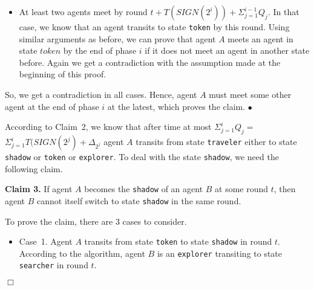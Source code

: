 \documentclass[11pt]{article}
\newcommand{\finclaim}{\hfill $\bullet$}
\newcommand{\qed}{\hfill $\Box$ \bigbreak}
\newenvironment{proof}{\noindent {\bf Proof.}}{\qed}
\begin{document}
\begin{proof}
\begin{itemize}
\item{At least two agents meet by round {$t+ T(SIGN(2^i)) + \Sigma_{j=1}^{i-1}Q_j$}. In that case, we know that an agent transits to state {\tt token} by this round. Using similar arguments as before, we can prove that agent $A$ meets an agent in state $token$ by the end of phase $i$ if it does not meet an agent in another state before. Again we get a contradiction with the assumption made at the beginning of this proof.}
\end{itemize}

{So, we get a contradiction in all cases. Hence, agent $A$ must meet some other agent at the end of phase $i$ at the latest, which proves the claim.} \finclaim

{According to Claim~2, we know that after time at most {$\Sigma_{j=1}^{i}Q_j=$\\ $\Sigma_{j=1}^{i} T(SIGN(2^j)+\Delta_{2^j}$} agent $A$ transits from state 
{\tt traveler} either to state {\tt shadow} or {\tt token} or {\tt explorer}.} {To deal with the state {\tt shadow}, we need the following claim.}

\vspace*{0.3cm}
\noindent
{{\bf Claim 3.} If agent $A$ becomes the {\tt shadow} of an agent $B$ at some round $t$, then agent $B$ cannot itself switch to state {\tt shadow} in the same round.}

{To prove the claim, there are $3$ cases to consider.}

\begin{itemize}
\item{ {Case~1.} Agent $A$ transits from state {\tt token} to state {\tt shadow} in round $t$. According to the algorithm, agent $B$ is an 
{\tt explorer} transiting to state {\tt searcher} in round $t$.}


\end{itemize}
\end{proof}
\end{document}
